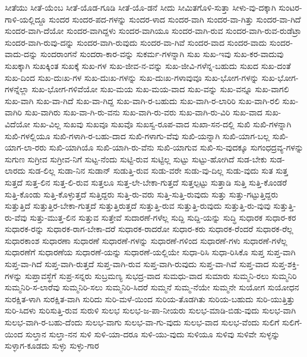 {ಸೀತೆಯು
ಸೀತೆ-ಯೆಂಬ
ಸೀತೆ-ಯೊಡ-ಗೂಡಿ
ಸೀತೆ-ಯೊ-ಡನೆ
ಸೀದು
ಸೀಮಿತಗೊಳಿ-ಸುತ್ತಾ
ಸೀಳು-ವು-ದಕ್ಕಾಗಿ
ಸುಂಟರ-ಗಾಳಿ-ಯಲ್ಲಿದ್ದೂ
ಸುಂದರ
ಸುಂದರ-ಪದ-ಗಳನ್ನು
ಸುಂದರ-ಳಾದ
ಸುಂದರ-ವಾಗಿ
ಸುಂದರ-ವಾ-ಗಿತ್ತು
ಸುಂದರ-ವಾ-ಗಿದೆ
ಸುಂದರ-ವಾಗಿ-ದೆಯೋ
ಸುಂದರ-ವಾಗಿದ್ದಳು
ಸುಂದರ-ವಾಗಿಯೂ
ಸುಂದರ-ವಾಗಿ-ರುವ
ಸುಂದರ-ವಾಗಿ-ರುವ-ರುಡೆಟ್ರಾ
ಸುಂದರ-ವಾಗಿ-ರುವು-ದನ್ನು
ಸುಂದರ-ವಾಗಿ-ರುವುದು
ಸುಂದರ-ವಾ-ಗಿವೆ
ಸುಂದರ-ವಾದ
ಸುಂದರ-ವಾದು
ಸುಂದರ-ವಾದು-ದನ್ನು
ಸುಂದರಾಂಗನೆ
ಸುಂದರಾ-ಕಾರ-ವನ್ನು
ಸುಕರ್ಮ-ಗಳನ್ನಾಗಿ
ಸುಖ
ಸುಖ-ಇವು
ಸುಖ-ಕರ-ವಾದುವು
ಸುಖಕ್ಕಾಗಿ
ಸುಖಕ್ಕಿಂತ
ಸುಖಕ್ಕೆ
ಸುಖ-ಗಳ
ಸುಖ-ಜೀವ-ನ-ವನ್ನು
ಸುಖ-ಜೀವಿ-ಗಳೆನ್ನ-ಬಹುದು
ಸುಖದ
ಸುಖ-ದಂತೆ
ಸುಖ-ದಿಂದ
ಸುಖ-ದುಃಖ-ಗಳ
ಸುಖ-ದುಃಖ-ಗಳನ್ನು
ಸುಖ-ದುಃಖ-ಗಳಾವುವೂ
ಸುಖ-ಭೋಗ-ಗಳನ್ನು
ಸುಖ-ಭೋಗ-ಗಳನ್ನೆಲ್ಲಾ
ಸುಖ-ಭೋಗ-ಗಳಿವೆಯೋ
ಸುಖ-ಮಯ
ಸುಖ-ಮಯ-ವಾದ
ಸುಖ-ವನ್ನು
ಸುಖ-ವನ್ನೂ
ಸುಖ-ವಾಗಲಿ
ಸುಖ-ವಾಗಿ
ಸುಖ-ವಾ-ಗಿದೆ
ಸುಖ-ವಾ-ಗಿದ್ದ
ಸುಖ-ವಾಗಿ-ರ-ಬಹುದು
ಸುಖ-ವಾಗಿ-ರ-ಲಾರಿರಿ
ಸುಖ-ವಾಗಿ-ರಲಿ
ಸುಖ-ವಾಗಿರಿ
ಸುಖ-ವಾಗಿರು
ಸುಖ-ವಾ-ಗಿ-ರು-ವನು
ಸುಖ-ವಾಗಿ-ರು-ವರು
ಸುಖ-ವಾಗಿ-ರು-ವಿರಿ
ಸುಖ-ವಾದ
ಸುಖ-ವಿದೆಯೋ
ಸುಖ-ವಿಲ್ಲ
ಸುಖವು
ಸುಖವೂ
ಸುಖವೊ
ಸುಖಸ್ವ-ರೂಪ-ವಾದ
ಸುಖಾ-ಸನ-ದಲ್ಲಿ
ಸುಖಿ
ಸುಖಿ-ಗಳನ್ನಾಗಿ
ಸುಖಿ-ಗಳಲ್ಲಿಯೂ
ಸುಖಿ-ಗಳಾಗಿ-ರ-ಬಹು-ದಾದ
ಸುಖಿ-ಗಳಾಗು-ವೆವು
ಸುಖಿ-ಯನ್ನಾಗಿ
ಸುಖಿ-ಯಾಗ-ಬಲ್ಲ
ಸುಖಿ-ಯಾಗ-ಲಾ-ರರು
ಸುಖಿ-ಯಾಗಿಯೊ
ಸುಖಿ-ಯಾಗಿ-ರು-ವೆನು
ಸುಖಿ-ಯಾಗುವ
ಸುಖಿ-ಸು-ವುದಕ್ಕೂ
ಸುಗಂಧದ್ರವ್ಯ-ಗಳನ್ನು
ಸುಗುಣ
ಸುಗ್ರೀವ
ಸುಗ್ರೀವ-ನಿಗೆ
ಸುಟ್ಟ-ನೆಂದು
ಸುಟ್ಟಿ-ರುವ
ಸುಟ್ಟಿಲ್ಲ
ಸುಟ್ಟು
ಸುಟ್ಟು-ಹೋಗಿದೆ
ಸುಡ-ಬೇಕು
ಸುಡ-ಲಾರದು
ಸುಡ-ಲಿಲ್ಲ
ಸುಡಾ-ನಿನ
ಸುಡಾನ್
ಸುಡುತ್ತಿ-ರುವ
ಸುಡು-ವರೇ
ಸುಡು-ವು-ದಿಲ್ಲ
ಸುಡು-ವುದು
ಸುತ
ಸುತ್ತ
ಸುತ್ತದೆ
ಸುತ್ತ-ಲಿನ
ಸುತ್ತ-ಲಿ-ರುವ
ಸುತ್ತಲೂ
ಸುತ್ತ-ಲೇ-ಬೇಕಾ-ಗುತ್ತದೆ
ಸುತ್ತಲ್ಪಟ್ಟು
ಸುತ್ತಾಡಿ
ಸುತ್ತಿ
ಸುತ್ತಿ-ಕೊಂಡರೆ
ಸುತ್ತಿ-ಕೊಂಡು
ಸುತ್ತಿ-ಕೊಳ್ಳುತ್ತದೆ
ಸುತ್ತಿದ್ದರು
ಸುತ್ತಿ-ರು-ವರು
ಸುತ್ತಿ-ಸುತ್ತಿ-ರುವುದು
ಸುತ್ತು
ಸುತ್ತು-ಗಟ್ಟುತ್ತಿದ್ದರು
ಸುತ್ತುತ್ತಿದೆ
ಸುತ್ತುತ್ತಿರ-ಬೇಕಾ-ಗುತ್ತದೆ
ಸುತ್ತುತ್ತಿರುತ್ತದೆ
ಸುತ್ತುತ್ತಿ-ರುವ
ಸುತ್ತುತ್ತಿ-ರುವುದು
ಸುತ್ತುತ್ತಿ-ರು-ವುವು
ಸುತ್ತುತ್ತಿ-ರು-ವೆವು
ಸುತ್ತು-ಮುತ್ತ-ಲಿನ
ಸುತ್ತುವ
ಸುತ್ತೇವೆ
ಸುದಾರಣೆ-ಗಳೆಲ್ಲ
ಸುದ್ದಿ
ಸುದ್ದಿ-ಯನ್ನು
ಸುದ್ಧಿ
ಸುಧಾರಕ
ಸುಧಾರ-ಕರ
ಸುಧಾರಕ-ರನ್ನು
ಸುಧಾರಕ-ರಾಗ-ಬೇಕಾ-ದರೆ
ಸುಧಾರಕ-ರಾದರೋ
ಸುಧಾರ-ಕರು
ಸುಧಾರಕ-ರೆಂದರೆ
ಸುಧಾರಕ-ರೆಲ್ಲ
ಸುಧಾರಕಾಂಶ
ಸುಧಾರಣಾ
ಸುಧಾರಣೆ
ಸುಧಾರಣೆ-ಗಳನ್ನು
ಸುಧಾರಣೆ-ಗಳಿಂದ
ಸುಧಾರಣೆ-ಗಳು
ಸುಧಾರಣೆ-ಗಳೆಲ್ಲ
ಸುಧಾರಣೆಗೆ
ಸುಧಾರಣೆಯ
ಸುಧಾರಣೆ-ಯನ್ನು
ಸುಧಾರಣೆ-ಯಲ್ಲಿಯೇ
ಸುಧಾ-ರಿಸಿ
ಸುಧಾ-ರಿಸಿಕೊ
ಸುಪ್ತ
ಸುಪ್ತ-ವಾಗಿ
ಸುಪ್ತ-ವಾ-ಗಿದೆ
ಸುಪ್ತ-ವಾಗಿ-ರುತ್ತದೆ
ಸುಪ್ತ-ವಾಗಿ-ರುವ
ಸುಪ್ತ-ವಾಗಿ-ರುವುದು
ಸುಪ್ತ-ವಾ-ಗಿವೆ
ಸುಪ್ತ-ವಾದ
ಸುಪ್ತ-ಶಕ್ತಿ-ಗಳನ್ನು
ಸುಪ್ತಾವಸ್ಥೆಗೆ
ಸುಪ್ರ-ಸನ್ನರು
ಸುಬ್ರಮಣ್ಯ
ಸುಭದ್ರ-ವಾದ
ಸುಮಧು-ವಾದ
ಸುಮಾರು
ಸುಮ್ಮನಿ-ರಲು
ಸುಮ್ಮನಿರಿ
ಸುಮ್ಮನಿರಿ-ಸ-ಲಾರೆವು
ಸುಮ್ಮನಿರಿ-ಸಲು
ಸುಮ್ಮನಿರಿ-ಸಿದರೆ
ಸುಮ್ಮನೆ
ಸುಮ್ಮ-ನೆಯೇ
ಸುಮ್ಮನೇ
ಸುಯೋಗ
ಸುಯೋಧನ
ಸುರಕ್ಷಿತ-ಳಾಗಿ
ಸುರಕ್ಷಿತ-ವಾಗಿ
ಸುರಿದು
ಸುರಿ-ಮಳೆ-ಯಿಂದ
ಸುರಿಯ-ತೊಡಗಿತು
ಸುರಿಯ-ಬಹುದು
ಸುರಿ-ಯುತ್ತಿತ್ತು
ಸುರಿ-ಸಿದಳು
ಸುರಿಸುತ್ತಿ-ರುವ
ಸುರುಳಿ
ಸುಲಭ
ಸುಲಭ-ಜ-ಪಾ-ನೀಯರು
ಸುಲಭ-ಮಾಡಿ-ಬಿಡು-ವುದು
ಸುಲಭ-ವಾಗಿ
ಸುಲಭ-ವಾಗಿ-ರ-ಬಹು-ದೆಂದು
ಸುಲಭ-ವಾಗು
ಸುಲಭ-ವಾ-ಗು-ವುದು
ಸುಲಭ-ವಾದ
ಸುಲಭ-ವೆಂದು
ಸುಲಿಗೆ
ಸುಲಿಗೆ-ಯಿಂದ
ಸುಲ್ತಾನ
ಸುಲ್ತಾ-ನನ
ಸುಳಿ
ಸುಳಿ-ಯಾ-ದರೂ
ಸುಳಿ-ಯು-ವುದು
ಸುಳಿಯೂ
ಸುಳಿವು
ಸುಳಿವೇ
ಸುಳ್ಳನ್ನು
ಸುಳ್ಳಾಗ-ಕೂಡದು
ಸುಳ್ಳು
ಸುಳ್ಳು-ಗಾರ
}
